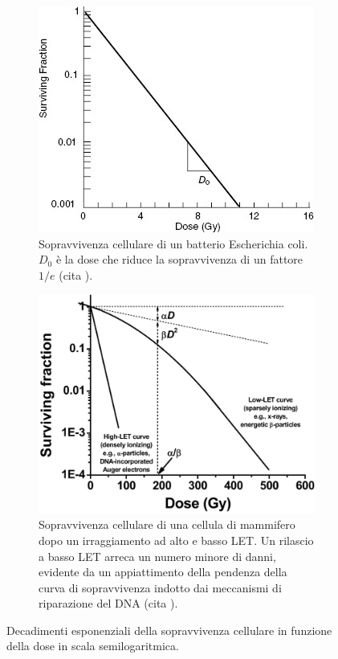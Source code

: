 \documentclass[12pt,a4paper,twoside]{report}
\begin{document}
	\begin{figure}[H]
		\centering
		\begin{subfigure}[t]{0.49\textwidth}
			\centering
			\includegraphics[width=\textwidth, scale=0.50]{survival1.jpg}
			\caption{Sopravvivenza cellulare di un batterio Escherichia coli. $D_0$ è la dose che riduce la sopravvivenza di un fattore $1/e$ (cita
				).}
			\label{fig:survival1}
		\end{subfigure}
		\hfill
		\begin{subfigure}[t]{0.49\textwidth}
			\centering
			\includegraphics[width=\textwidth, scale=0.50]{survival2.png}
			\caption{Sopravvivenza cellulare di una cellula di mammifero dopo un irraggiamento ad alto e basso LET. Un rilascio a basso LET arreca un numero minore di danni, evidente da un appiattimento della pendenza della curva di sopravvivenza indotto dai meccanismi di riparazione del DNA (cita
				).}
			\label{fig:survival2}
		\end{subfigure}
		\caption{Decadimenti esponenziali della sopravvivenza cellulare in funzione della dose in scala semilogaritmica.}
	\end{figure}
\end{document}
